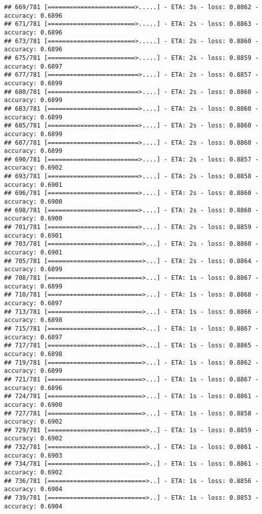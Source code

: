 \documentclass[
]{article}
\begin{document}
\begin{verbatim}
## 669/781 [========================>.....] - ETA: 3s - loss: 0.8862 - accuracy: 0.6896
## 671/781 [========================>.....] - ETA: 2s - loss: 0.8863 - accuracy: 0.6896
## 673/781 [========================>.....] - ETA: 2s - loss: 0.8860 - accuracy: 0.6896
## 675/781 [========================>.....] - ETA: 2s - loss: 0.8859 - accuracy: 0.6897
## 677/781 [=========================>....] - ETA: 2s - loss: 0.8857 - accuracy: 0.6899
## 680/781 [=========================>....] - ETA: 2s - loss: 0.8860 - accuracy: 0.6899
## 683/781 [=========================>....] - ETA: 2s - loss: 0.8860 - accuracy: 0.6899
## 685/781 [=========================>....] - ETA: 2s - loss: 0.8860 - accuracy: 0.6899
## 687/781 [=========================>....] - ETA: 2s - loss: 0.8860 - accuracy: 0.6899
## 690/781 [=========================>....] - ETA: 2s - loss: 0.8857 - accuracy: 0.6902
## 693/781 [=========================>....] - ETA: 2s - loss: 0.8858 - accuracy: 0.6901
## 696/781 [=========================>....] - ETA: 2s - loss: 0.8860 - accuracy: 0.6900
## 698/781 [=========================>....] - ETA: 2s - loss: 0.8860 - accuracy: 0.6900
## 701/781 [=========================>....] - ETA: 2s - loss: 0.8859 - accuracy: 0.6901
## 703/781 [==========================>...] - ETA: 2s - loss: 0.8860 - accuracy: 0.6901
## 705/781 [==========================>...] - ETA: 2s - loss: 0.8864 - accuracy: 0.6899
## 708/781 [==========================>...] - ETA: 1s - loss: 0.8867 - accuracy: 0.6899
## 710/781 [==========================>...] - ETA: 1s - loss: 0.8868 - accuracy: 0.6897
## 713/781 [==========================>...] - ETA: 1s - loss: 0.8866 - accuracy: 0.6898
## 715/781 [==========================>...] - ETA: 1s - loss: 0.8867 - accuracy: 0.6897
## 717/781 [==========================>...] - ETA: 1s - loss: 0.8865 - accuracy: 0.6898
## 719/781 [==========================>...] - ETA: 1s - loss: 0.8862 - accuracy: 0.6899
## 721/781 [==========================>...] - ETA: 1s - loss: 0.8867 - accuracy: 0.6896
## 724/781 [==========================>...] - ETA: 1s - loss: 0.8861 - accuracy: 0.6900
## 727/781 [==========================>...] - ETA: 1s - loss: 0.8858 - accuracy: 0.6902
## 729/781 [===========================>..] - ETA: 1s - loss: 0.8859 - accuracy: 0.6902
## 732/781 [===========================>..] - ETA: 1s - loss: 0.8861 - accuracy: 0.6903
## 734/781 [===========================>..] - ETA: 1s - loss: 0.8861 - accuracy: 0.6902
## 736/781 [===========================>..] - ETA: 1s - loss: 0.8856 - accuracy: 0.6904
## 739/781 [===========================>..] - ETA: 1s - loss: 0.8853 - accuracy: 0.6904

\end{verbatim}
\end{document}
